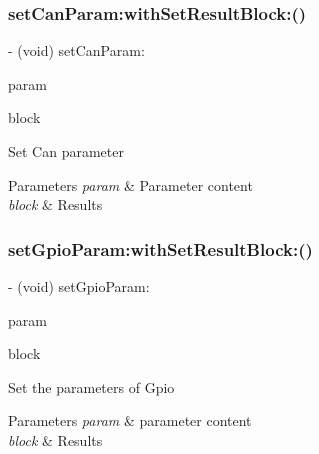 \subsubsection{\texorpdfstring{set\+Can\+Param\+:with\+Set\+Result\+Block\+:()}{setCanParam:withSetResultBlock:()}}
{\footnotesize\ttfamily -\/ (void) set\+Can\+Param\+: \begin{DoxyParamCaption}\item[{(\hyperlink{struct_p_v_s_d_k___m_o_u_n_t_a_p_i___c_a_n___p_a_r_a_m}{P\+V\+S\+D\+K\+\_\+\+M\+O\+U\+N\+T\+A\+P\+I\+\_\+\+C\+A\+N\+\_\+\+P\+A\+R\+AM})}]{param }\item[{withSetResultBlock:(P\+V\+Set\+Param\+Result\+Block)}]{block }\end{DoxyParamCaption}}

Set Can parameter


\begin{DoxyParams}{Parameters}
{\em param} & Parameter content \\
\hline
{\em block} & Results \\
\hline
\end{DoxyParams}
\mbox{\label{interface_p_v_mount_a0f4ec792225f7ec44f258825d4382953}} 
\subsubsection{\texorpdfstring{set\+Gpio\+Param\+:with\+Set\+Result\+Block\+:()}{setGpioParam:withSetResultBlock:()}}
{\footnotesize\ttfamily -\/ (void) set\+Gpio\+Param\+: \begin{DoxyParamCaption}\item[{(\hyperlink{struct_p_v_s_d_k___m_o_u_n_t_a_p_i___g_p_i_o___p_a_r_a_m}{P\+V\+S\+D\+K\+\_\+\+M\+O\+U\+N\+T\+A\+P\+I\+\_\+\+G\+P\+I\+O\+\_\+\+P\+A\+R\+AM})}]{param }\item[{withSetResultBlock:(P\+V\+Set\+Param\+Result\+Block)}]{block }\end{DoxyParamCaption}}

Set the parameters of Gpio


\begin{DoxyParams}{Parameters}
{\em param} & parameter content \\
\hline
{\em block} & Results \\
\hline
\end{DoxyParams}
\mbox{\label{interface_p_v_mount_ad45731021d189dfb946481c4fb575792}} 
